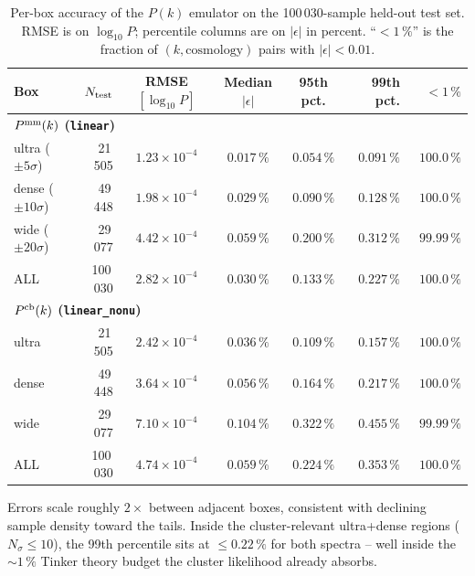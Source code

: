 \documentclass[a4paper, 11pt]{article}
\newcommand{\eps}{\epsilon}
\begin{document}
\begin{table}[htb]
  \centering
  \caption{Per-box accuracy of the $P(k)$ emulator on the
  100\,030-sample held-out test set. RMSE is on $\log_{10} P$;
  percentile columns are on $|\eps|$ in percent. ``$<1\,\%$'' is
  the fraction of $(k, \mathrm{cosmology})$ pairs with
  $|\eps| < 0.01$.}
  \label{tab:per-box}
  \begin{tabular}{lrcccrr}
    \toprule
    Box & $N_{\rm test}$ & RMSE $[\log_{10} P]$ &
        Median $|\eps|$ & 95th pct. & 99th pct. & $< 1\,\%$ \\
    \midrule
    \multicolumn{7}{l}{\textbf{$P^{\rm mm}(k)$ (\texttt{linear})}} \\
    \quad ultra ($\pm 5\sigma$)  & 21\,505  & $1.23\times 10^{-4}$ & $0.017\,\%$ & $0.054\,\%$ & $0.091\,\%$ & $100.0\,\%$ \\
    \quad dense ($\pm 10\sigma$) & 49\,448  & $1.98\times 10^{-4}$ & $0.029\,\%$ & $0.090\,\%$ & $0.128\,\%$ & $100.0\,\%$ \\
    \quad wide  ($\pm 20\sigma$) & 29\,077  & $4.42\times 10^{-4}$ & $0.059\,\%$ & $0.200\,\%$ & $0.312\,\%$ & $\phantom{0}99.99\,\%$ \\
    \quad ALL                    & 100\,030 & $2.82\times 10^{-4}$ & $0.030\,\%$ & $0.133\,\%$ & $0.227\,\%$ & $100.0\,\%$ \\
    \midrule
    \multicolumn{7}{l}{\textbf{$P^{\rm cb}(k)$ (\texttt{linear\_nonu})}} \\
    \quad ultra                  & 21\,505  & $2.42\times 10^{-4}$ & $0.036\,\%$ & $0.109\,\%$ & $0.157\,\%$ & $100.0\,\%$ \\
    \quad dense                  & 49\,448  & $3.64\times 10^{-4}$ & $0.056\,\%$ & $0.164\,\%$ & $0.217\,\%$ & $100.0\,\%$ \\
    \quad wide                   & 29\,077  & $7.10\times 10^{-4}$ & $0.104\,\%$ & $0.322\,\%$ & $0.455\,\%$ & $\phantom{0}99.99\,\%$ \\
    \quad ALL                    & 100\,030 & $4.74\times 10^{-4}$ & $0.059\,\%$ & $0.224\,\%$ & $0.353\,\%$ & $100.0\,\%$ \\
    \bottomrule
  \end{tabular}
\end{table}

Errors scale roughly $2\times$ between adjacent boxes, consistent
with declining sample density toward the tails. Inside the
cluster-relevant ultra+dense regions ($N_\sigma \le 10$), the 99th
percentile sits at $\le 0.22\,\%$ for both spectra -- well inside the
$\sim 1\,\%$ Tinker theory budget the cluster likelihood already
absorbs.
\end{document}
